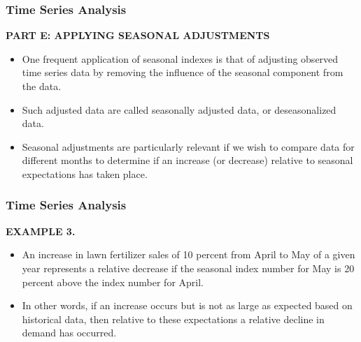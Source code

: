 \documentclass{beamer}
\begin{document}
\begin{frame}
\frametitle{Time Series Analysis}
\textbf{PART E: APPLYING SEASONAL ADJUSTMENTS}
\begin{itemize}

\item One frequent application of seasonal indexes is that of adjusting observed time series data by removing the
influence of the seasonal component from the data. 
\item Such adjusted data are called seasonally adjusted data, or
deseasonalized data. 
\item Seasonal adjustments are particularly relevant if we wish to compare data for different
months to determine if an increase (or decrease) relative to seasonal expectations has taken place.
\end{itemize}
\end{frame}
\begin{frame}
\frametitle{Time Series Analysis}
\textbf{EXAMPLE 3. }
\begin{itemize}
\item An increase in lawn fertilizer sales of 10 percent from April to May of a given year represents a relative
decrease if the seasonal index number for May is 20 percent above the index number for April. 
\item In other words, if an increase
occurs but is not as large as expected based on historical data, then relative to these expectations a relative decline in demand
has occurred.
\end{itemize}
\end{frame}
\end{document}
